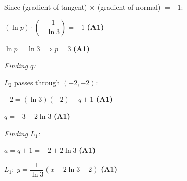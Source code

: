 \documentclass[12pt, twoside]{article}
\begin{document}
\begin{enumerate}[itemsep=0.3cm]
Since (gradient of tangent) $\times$ (gradient of normal) $= -1$:

$(\ln p) \cdot \left(-\dfrac{1}{\ln 3}\right) = -1$ \hfill \textbf{(A1)}

$\ln p = \ln 3 \implies p = 3$ \hfill \textbf{(A1)}

\emph{Finding $q$:}

$L_2$ passes through $(-2, -2)$:

$-2 = (\ln 3)(-2) + q + 1$ \hfill \textbf{(A1)}

$q = -3 + 2\ln 3$ \hfill \textbf{(A1)}

\emph{Finding $L_1$:}

$a = q + 1 = -2 + 2\ln 3$ \hfill \textbf{(A1)}

$L_1: \; y = \dfrac{1}{\ln 3}(x - 2\ln 3 + 2)$ \hfill \textbf{(A1)}

\end{enumerate}
\end{document}
